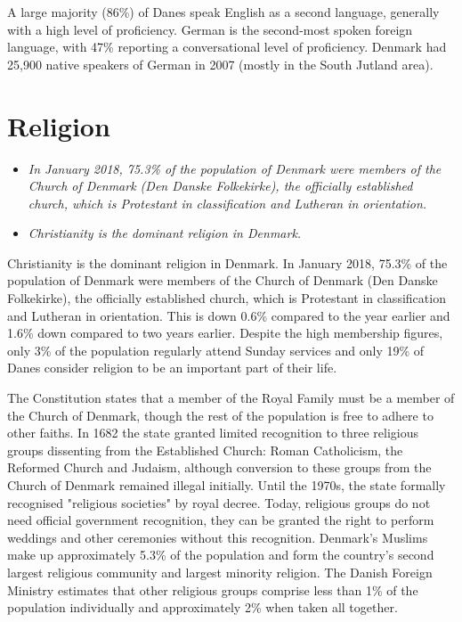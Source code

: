 A large majority (86\%) of Danes speak English as a second language,
generally with a high level of proficiency. German is the second-most
spoken foreign language, with 47\% reporting a conversational level of
proficiency. Denmark had 25,900 native speakers of German in 2007
(mostly in the South Jutland area).

\section{Religion}\label{religion}

\begin{itemize}
\item
  \emph{In January 2018, 75.3\% of the population of Denmark were
  members of the Church of Denmark (Den Danske Folkekirke), the
  officially established church, which is Protestant in classification
  and Lutheran in orientation.}
\item
  \emph{Christianity is the dominant religion in Denmark.}
\end{itemize}

Christianity is the dominant religion in Denmark. In January 2018,
75.3\% of the population of Denmark were members of the Church of
Denmark (Den Danske Folkekirke), the officially established church,
which is Protestant in classification and Lutheran in orientation. This
is down 0.6\% compared to the year earlier and 1.6\% down compared to
two years earlier. Despite the high membership figures, only 3\% of the
population regularly attend Sunday services and only 19\% of Danes
consider religion to be an important part of their life.

The Constitution states that a member of the Royal Family must be a
member of the Church of Denmark, though the rest of the population is
free to adhere to other faiths. In 1682 the state granted limited
recognition to three religious groups dissenting from the Established
Church: Roman Catholicism, the Reformed Church and Judaism, although
conversion to these groups from the Church of Denmark remained illegal
initially. Until the 1970s, the state formally recognised "religious
societies" by royal decree. Today, religious groups do not need official
government recognition, they can be granted the right to perform
weddings and other ceremonies without this recognition. Denmark's
Muslims make up approximately 5.3\% of the population and form the
country's second largest religious community and largest minority
religion. The Danish Foreign Ministry estimates that other religious
groups comprise less than 1\% of the population individually and
approximately 2\% when taken all together.

